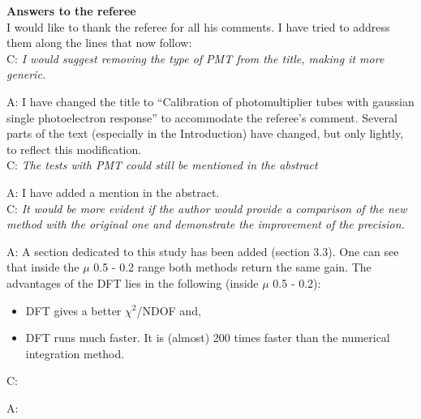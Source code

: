 \documentclass[a4paper,11pt]{article}
\begin{document}
{\bf Answers to the referee}
\\[1ex]

I would like to thank the referee for all his comments. 
I have tried to address them along the lines that now follow:
\\[1ex]

C: \emph{ I would suggest removing the type of PMT from the title, making it more generic. } 
	
A: I have changed the title to ``Calibration of photomultiplier tubes with gaussian single photoelectron response'' 
to accommodate the referee's comment.
Several parts of the text (especially in the Introduction) have changed, but only lightly, to reflect this modification. 
\\[1ex]

C: \emph{The tests with PMT could still be mentioned in the abstract} 

A: I have added a mention in the abstract.
\\[1ex]

C: \emph{ It would be more evident if the author would provide a comparison of the new method with the original one and demonstrate the improvement of the precision. }
	
A: A section dedicated to this study has been added (section 3.3). 
One can see that inside the $\mu$ 0.5 - 0.2 range both methods return the same gain. 
The advantages of the DFT lies in the following (inside $\mu$ 0.5 - 0.2):
\begin{itemize}
\item DFT gives a better $\chi^2$/NDOF and, 
\item DFT runs much faster. 
It is (almost) 200 times faster than the numerical integration method. 
\end{itemize}


C: 

A:
\end{document}
